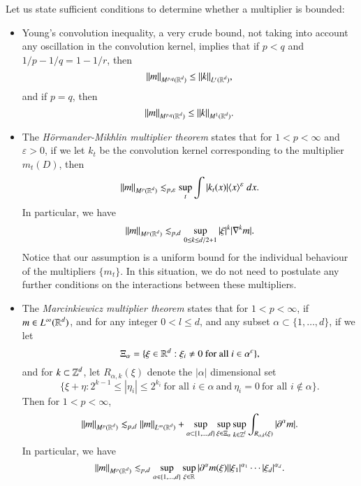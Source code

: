 Let us state sufficient conditions to determine whether a multiplier is bounded:
%
\begin{itemize}
    \item Young's convolution inequality, a very crude bound, not taking into account any oscillation in the convolution kernel, implies that if $p < q$ and $1/p - 1/q = 1 - 1/r$, then
    \[ \| m \|_{M^{p,q}(\operatorname{\mathbb{R}}^d)} \leq \| k \|_{L^r(\operatorname{\mathbb{R}}^d)}, \]
    and if $p = q$, then
    \[ \| m \|_{M^{p,q}(\operatorname{\mathbb{R}}^d)} \leq \| k \|_{M^1(\operatorname{\mathbb{R}}^d)}. \]
%
% 
%
%
%
%

    \item The \emph{H\"{o}rmander-Mikhlin multiplier theorem} states that for $1 < p < \infty$ and $\varepsilon > 0$, if we let $k_t$ be the convolution kernel corresponding to the multiplier $m_t(D)$, then
    \[ \| m \|_{M^p(\operatorname{\mathbb{R}}^d)} \lesssim_{p,\varepsilon} \sup_t \int |k_t(x)| \langle x \rangle^\varepsilon\; dx. \]
    In particular, we have
    \[ \| m \|_{M^p(\operatorname{\mathbb{R}}^d)} \lesssim_{p,d} \sup_{0 \leq k \leq d/2 + 1} |\xi|^k |\nabla^k m|. \]
    Notice that our assumption is a uniform bound for the individual behaviour of the multipliers $\{ m_t \}$. In this situation, we do not need to postulate any further conditions on the interactions between these multipliers.

    \item The \emph{Marcinkiewicz multiplier theorem} states that for $1 < p < \infty$, if $m \in L^\infty(\operatorname{\mathbb{R}}^d)$, and for any integer $0 < l \leq d$, and any subset $\alpha \subset \{ 1, \dots, d \}$, if we let
    \[ \Xi_\alpha = \{ \xi \in \operatorname{\mathbb{R}}^d: \xi_i \neq 0\ \text{for all $i \in \alpha^c$} \}, \]
    and for $k \subset \operatorname{\mathbb{Z}}^d$, let $R_{\alpha,k}(\xi)$ denote the $|\alpha|$ dimensional set
    \[ \{ \xi + \eta: 2^{k-1} \leq |\eta_i| \leq 2^{k_i}\ \text{for all $i \in \alpha$}\ \text{and}\ \eta_i = 0\ \text{for all $i \not \in \alpha$} \}. \]
    Then for $1 < p < \infty$,
    \[ \| m \|_{M^p(\operatorname{\mathbb{R}}^d)} \lesssim_{p,d} \| m \|_{L^\infty(\operatorname{\mathbb{R}}^d)} + \sup_{\alpha \subset \{ 1, \dots, d \}} \sup_{\xi \in \Xi_\alpha} \sup_{k \in \operatorname{\mathbb{Z}}^l} \int_{R_{\alpha,k}(\xi)} |\partial^\alpha m|. \]
    In particular, we have
    \[ \| m \|_{M^p(\operatorname{\mathbb{R}}^d)} \lesssim_{p,d} \sup_{\alpha \in \{ 1, \dots, d \}} \sup_{\xi \in \operatorname{\mathbb{R}}} |\partial^\alpha m(\xi)| |\xi_1|^{\alpha_1} \cdots |\xi_d|^{\alpha_d}. \]
\end{itemize}

